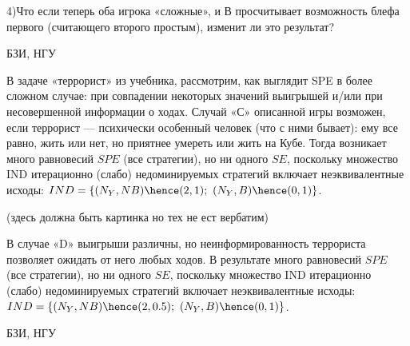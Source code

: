 \begin{problem}
4)Что если теперь оба игрока «сложные», и В просчитывает
возможность блефа первого (считающего второго простым),
изменит ли это результат?



\begin{source}
БЗИ, НГУ
\end{source}


\begin{sol}

\end{sol}
\end{problem}




\begin{problem}
 {\rm В задаче «террорист» из учебника,
рассмотрим, как выглядит SPE в более сложном случае: при
совпадении некоторых значений выигрышей и/или при
несовершенной информации о ходах. Случай «С» описанной
игры возможен, если террорист — психически особенный
человек (что с ними бывает): ему все равно, жить или нет,
но приятнее умереть или жить на Кубе. Тогда возникает много
равновесий $SPE$ (все стратегии), но ни одного $SE$,
поскольку множество IND итерационно (слабо) недоминируемых
стратегий включает неэквивалентные исходы: $IND=\{
(N_Y,NB)\hence (2,1);~ (N_Y,B)\hence (0,1)\}$.

(здесь должна быть картинка но тех не ест вербатим)



В случае «D» выигрыши различны, но неинформированность
террориста позволяет ожидать от него любых ходов. В
результате много равновесий $SPE$ (все стратегии), но ни
одного $SE$, поскольку множество IND итерационно (слабо)
недоминируемых стратегий включает неэквивалентные исходы:
$IND=\{ (N_Y,NB)\hence (2,0.5);~ (N_Y,B)\hence (0,1)\}$.}



\begin{source}
БЗИ, НГУ
\end{source}


\begin{sol}

\end{sol}
\end{problem}




